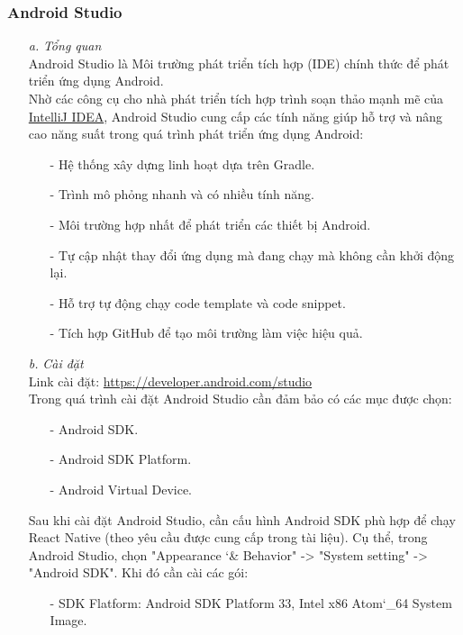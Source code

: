 \subsubsection{Android Studio}
\begin{enumerate}
    \item[\textit{a.}] {\textit{Tổng quan}}\\
    Android Studio là Môi trường phát triển tích hợp (IDE) chính thức để phát triển ứng dụng Android.\\
    Nhờ các công cụ cho nhà phát triển tích hợp trình soạn thảo mạnh mẽ của  \href{https://www.jetbrains.com/idea/}{IntelliJ IDEA}, Android Studio cung cấp các tính năng giúp hỗ trợ và nâng cao năng suất trong quá trình phát triển ứng dụng Android:
    \begin{enumerate}
        \item[-] Hệ thống xây dựng linh hoạt dựa trên Gradle.
        \item[-] Trình mô phỏng nhanh và có nhiều tính năng.
        \item[-] Môi trường hợp nhất để phát triển các thiết bị Android.
        \item[-] Tự cập nhật thay đổi ứng dụng mà đang chạy mà không cần khởi động lại.
        \item[-] Hỗ trợ tự động chạy code template và code snippet.
        \item[-] Tích hợp GitHub để tạo môi trường làm việc hiệu quả.
    \end{enumerate}
    \item[\textit{b.}] {\textit{Cài đặt}}\\
    Link cài đặt: \url{https://developer.android.com/studio}\\
    Trong quá trình cài đặt Android Studio cần đảm bảo có các mục được chọn:
    \begin{enumerate}
        \item[-] Android SDK.
        \item[-] Android SDK Platform.
        \item[-] Android Virtual Device.
    \end{enumerate}
    Sau khi cài đặt Android Studio, cần cấu hình Android SDK phù hợp để chạy React Native (theo yêu cầu được cung cấp trong tài liệu). Cụ thể, trong Android Studio, chọn "Appearance \char`& Behavior" -> "System setting" -> "Android SDK". Khi đó cần cài các gói:
    \begin{enumerate}
        \item[-] SDK Flatform: Android SDK Platform 33, Intel x86 Atom\char`_64 System Image.

\end{enumerate}
\end{enumerate}
